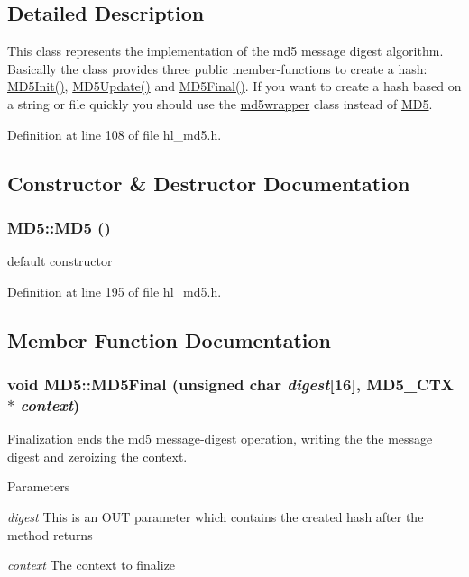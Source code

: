 \subsection{Detailed Description}
This class represents the implementation of the md5 message digest algorithm. Basically the class provides three public member-\/functions to create a hash: \hyperlink{class_m_d5_ad7a5fd3b9b97865ded5ac8ecd24905fc}{MD5Init()}, \hyperlink{class_m_d5_afdab8c1ad9a976589f78a64c534d2c54}{MD5Update()} and \hyperlink{class_m_d5_af527ca99477e2cff37a4f1952bcc7f90}{MD5Final()}. If you want to create a hash based on a string or file quickly you should use the \hyperlink{classmd5wrapper}{md5wrapper} class instead of \hyperlink{class_m_d5}{MD5}. 

Definition at line 108 of file hl\_\-md5.h.

\subsection{Constructor \& Destructor Documentation}
\hypertarget{class_m_d5_afa6155ec36de415ab2dcf5e54b670d13}{
\subsubsection[{MD5}]{\setlength{\rightskip}{0pt plus 5cm}MD5::MD5 ()}}
\label{class_m_d5_afa6155ec36de415ab2dcf5e54b670d13}


default constructor 

Definition at line 195 of file hl\_\-md5.h.

\subsection{Member Function Documentation}
\hypertarget{class_m_d5_af527ca99477e2cff37a4f1952bcc7f90}{
\subsubsection[{MD5Final}]{\setlength{\rightskip}{0pt plus 5cm}void MD5::MD5Final (unsigned char {\em digest}\mbox{[}16\mbox{]}, \/  {\bf MD5\_\-CTX} $\ast$ {\em context})}}
\label{class_m_d5_af527ca99477e2cff37a4f1952bcc7f90}


Finalization ends the md5 message-\/digest operation, writing the the message digest and zeroizing the context. 
\begin{DoxyParams}{Parameters}
\item[{\em digest}]This is an OUT parameter which contains the created hash after the method returns \item[{\em context}]The context to finalize \end{DoxyParams}


